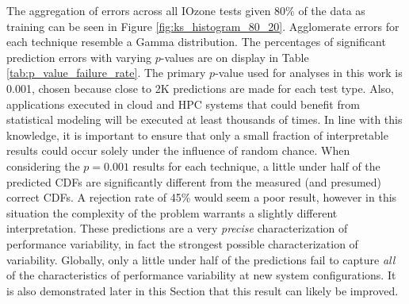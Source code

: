 \documentclass[letterpaper, 10 pt, conference]{ieeeconf}  %
\begin{document}
The aggregation of errors across all IOzone tests given 80\% of the data as training can be seen in Figure \ref{fig:ks_histogram_80_20}. Agglomerate errors for each technique resemble a Gamma distribution. The percentages of significant prediction errors with varying $p$-values are on display in Table \ref{tab:p_value_failure_rate}. The primary $p$-value used for analyses in this work is 0.001, chosen because close to 2K predictions are made for each test type. Also, applications executed in cloud and HPC systems that could benefit from statistical modeling will be executed at least thousands of times. In line with this knowledge, it is important to ensure that only a small fraction of interpretable results could occur solely under the influence of random chance. When considering the $p=0.001$ results for each technique, a little under half of the predicted CDFs are significantly different from the measured (and presumed) correct CDFs. A rejection rate of 45\% would seem a poor result, however in this situation the complexity of the problem warrants a slightly different interpretation. These predictions are a very \textit{precise} characterization of performance variability, in fact the strongest possible characterization of variability. Globally, only a little under half of the predictions fail to capture \textit{all} of the characteristics of performance variability at new system configurations. It is also demonstrated later in this Section that this result can likely be improved.
\end{document}
